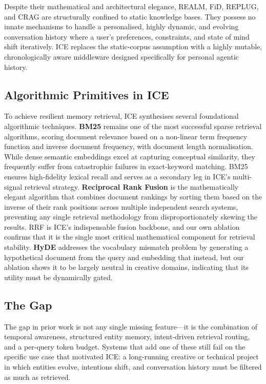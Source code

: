 \documentclass[11pt,a4paper]{article}
\begin{document}
Despite their mathematical and architectural elegance, REALM, FiD, REPLUG, and CRAG are structurally confined to static knowledge bases. They possess no innate mechanisms to handle a personalised, highly dynamic, and evolving conversation history where a user's preferences, constraints, and state of mind shift iteratively. ICE replaces the static-corpus assumption with a highly mutable, chronologically aware middleware designed specifically for personal agentic history.

\subsection{Algorithmic Primitives in ICE}

To achieve resilient memory retrieval, ICE synthesises several foundational algorithmic techniques. \textbf{BM25} \citep{robertson2009bm25} remains one of the most successful sparse retrieval algorithms, scoring document relevance based on a non-linear term frequency function and inverse document frequency, with document length normalisation. While dense semantic embeddings excel at capturing conceptual similarity, they frequently suffer from catastrophic failures in exact-keyword matching. BM25 ensures high-fidelity lexical recall and serves as a secondary leg in ICE's multi-signal retrieval strategy. \textbf{Reciprocal Rank Fusion} \citep{cormack2009rrf} is the mathematically elegant algorithm that combines document rankings by sorting them based on the inverse of their rank positions across multiple independent search systems, preventing any single retrieval methodology from disproportionately skewing the results. RRF is ICE's indispensable fusion backbone, and our own ablation confirms that it is the single most critical mathematical component for retrieval stability. \textbf{HyDE} \citep{gao2023hyde} addresses the vocabulary mismatch problem by generating a hypothetical document from the query and embedding that instead, but our ablation shows it to be largely neutral in creative domains, indicating that its utility must be dynamically gated.

\subsection{The Gap}

The gap in prior work is not any single missing feature---it is the combination of temporal awareness, structured entity memory, intent-driven retrieval routing, and a per-query token budget. Systems that add one of these still fail on the specific use case that motivated ICE: a long-running creative or technical project in which entities evolve, intentions shift, and conversation history must be filtered as much as retrieved.
\end{document}
